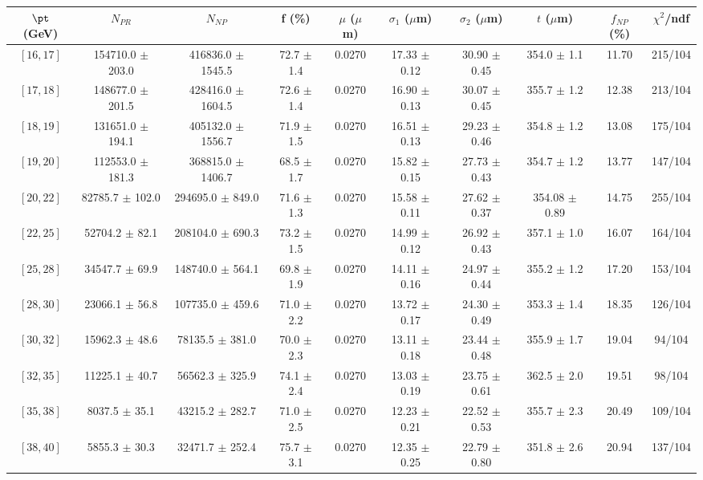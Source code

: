 \begin{tabular}{c||c|c|c|c|c|c|c||c|c}
$\pt$ (GeV) & $N_{PR}$ & $N_{NP}$ & f (\%) & $\mu$ ($\mu$m) & $\sigma_1$ ($\mu$m) & $\sigma_2$ ($\mu$m)  & $t$ ($\mu$m) & $f_{NP}$ (\%) & $\chi^2$/ndf \\
\hline
$[16, 17]$ & 154710.0 $\pm$ 203.0 & 416836.0 $\pm$ 1545.5 & 72.7 $\pm$ 1.4 & 0.0270 & 17.33 $\pm$ 0.12 & 30.90 $\pm$ 0.45 & 354.0 $\pm$ 1.1 & 11.70 & 215/104\\
$[17, 18]$ & 148677.0 $\pm$ 201.5 & 428416.0 $\pm$ 1604.5 & 72.6 $\pm$ 1.4 & 0.0270 & 16.90 $\pm$ 0.13 & 30.07 $\pm$ 0.45 & 355.7 $\pm$ 1.2 & 12.38 & 213/104\\
$[18, 19]$ & 131651.0 $\pm$ 194.1 & 405132.0 $\pm$ 1556.7 & 71.9 $\pm$ 1.5 & 0.0270 & 16.51 $\pm$ 0.13 & 29.23 $\pm$ 0.46 & 354.8 $\pm$ 1.2 & 13.08 & 175/104\\
$[19, 20]$ & 112553.0 $\pm$ 181.3 & 368815.0 $\pm$ 1406.7 & 68.5 $\pm$ 1.7 & 0.0270 & 15.82 $\pm$ 0.15 & 27.73 $\pm$ 0.43 & 354.7 $\pm$ 1.2 & 13.77 & 147/104\\
$[20, 22]$ & 82785.7 $\pm$ 102.0 & 294695.0 $\pm$ 849.0 & 71.6 $\pm$ 1.3 & 0.0270 & 15.58 $\pm$ 0.11 & 27.62 $\pm$ 0.37 & 354.08 $\pm$ 0.89 & 14.75 & 255/104\\
$[22, 25]$ & 52704.2 $\pm$ 82.1 & 208104.0 $\pm$ 690.3 & 73.2 $\pm$ 1.5 & 0.0270 & 14.99 $\pm$ 0.12 & 26.92 $\pm$ 0.43 & 357.1 $\pm$ 1.0 & 16.07 & 164/104\\
$[25, 28]$ & 34547.7 $\pm$ 69.9 & 148740.0 $\pm$ 564.1 & 69.8 $\pm$ 1.9 & 0.0270 & 14.11 $\pm$ 0.16 & 24.97 $\pm$ 0.44 & 355.2 $\pm$ 1.2 & 17.20 & 153/104\\
$[28, 30]$ & 23066.1 $\pm$ 56.8 & 107735.0 $\pm$ 459.6 & 71.0 $\pm$ 2.2 & 0.0270 & 13.72 $\pm$ 0.17 & 24.30 $\pm$ 0.49 & 353.3 $\pm$ 1.4 & 18.35 & 126/104\\
$[30, 32]$ & 15962.3 $\pm$ 48.6 & 78135.5 $\pm$ 381.0 & 70.0 $\pm$ 2.3 & 0.0270 & 13.11 $\pm$ 0.18 & 23.44 $\pm$ 0.48 & 355.9 $\pm$ 1.7 & 19.04 & 94/104\\
$[32, 35]$ & 11225.1 $\pm$ 40.7 & 56562.3 $\pm$ 325.9 & 74.1 $\pm$ 2.4 & 0.0270 & 13.03 $\pm$ 0.19 & 23.75 $\pm$ 0.61 & 362.5 $\pm$ 2.0 & 19.51 & 98/104\\
$[35, 38]$ & 8037.5 $\pm$ 35.1 & 43215.2 $\pm$ 282.7 & 71.0 $\pm$ 2.5 & 0.0270 & 12.23 $\pm$ 0.21 & 22.52 $\pm$ 0.53 & 355.7 $\pm$ 2.3 & 20.49 & 109/104\\
$[38, 40]$ & 5855.3 $\pm$ 30.3 & 32471.7 $\pm$ 252.4 & 75.7 $\pm$ 3.1 & 0.0270 & 12.35 $\pm$ 0.25 & 22.79 $\pm$ 0.80 & 351.8 $\pm$ 2.6 & 20.94 & 137/104\\

\end{tabular}

